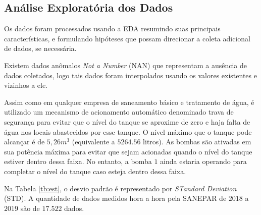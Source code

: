 \subsection{An\'alise Explorat\'oria dos Dados}

Os dados foram processados usando a EDA  \cite{Bandara2021} resumindo suas principais características, e formulando hipóteses que possam direcionar a coleta adicional de dados, se necessária. 

Existem dados anômalos \textit{Not a Number} (NAN) que representam a ausência de dados coletados, logo tais dados foram interpolados usando os valores existentes e vizinhos a ele. 

Assim como em qualquer empresa de saneamento básico e tratamento de água, é utilizado um mecanismo de acionamento automático denominado trava de segurança para evitar que o nível do tanque se aproxime de zero e haja falta de água nos locais abastecidos por esse tanque. O nível máximo que o tanque pode alcançar é de $5,26 m^3$ (equivalente a $5264.56$ litros). As bombas são ativadas em sua potência máxima para evitar que sejam acionadas quando o nível do tanque estiver dentro dessa faixa. No entanto, a bomba $1$ ainda estaria operando para completar o nível do tanque caso esteja dentro dessa faixa. 

Na Tabela \ref{tb:est}, o desvio padrão é representado por \textit{STandard Deviation} (STD). A quantidade de dados medidos hora a hora pela SANEPAR de $2018$ a $2019$ são de $17.522$ dados.

